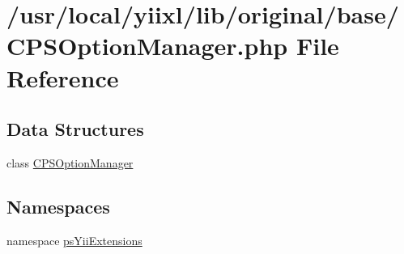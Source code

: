 \hypertarget{CPSOptionManager_8php}{
\section{/usr/local/yiixl/lib/original/base/CPSOptionManager.php File Reference}
\label{CPSOptionManager_8php}
}
\subsection*{Data Structures}
\begin{DoxyCompactItemize}
\item 
class \hyperlink{classCPSOptionManager}{CPSOptionManager}
\end{DoxyCompactItemize}
\subsection*{Namespaces}
\begin{DoxyCompactItemize}
\item 
namespace \hyperlink{namespacepsYiiExtensions}{psYiiExtensions}
\end{DoxyCompactItemize}
